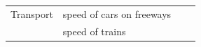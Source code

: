 {{\begin{center}
\begin{tabular}[t]{|l|l|l|l|}
    
        Transport &
    
    
        speed of cars on freeways &
    
    
         &
    
    
     \tabularnewline\cline{1-1}\cline{2-2}\cline{3-3}\cline{4-4}
    
    
         &
    
    
        speed of trains &
    
    
         &
    
    
     \tabularnewline\cline{1-1}\cline{2-2}\cline{3-3}\cline{4-4}
    

\end{tabular}
\end{center}}}
